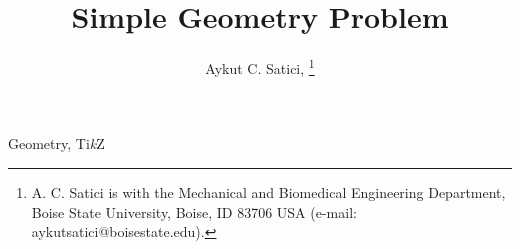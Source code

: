 \documentclass[journal,twoside,web]{ieeecolor}
\begin{document}
\title{Simple Geometry Problem} 
\author{
    Aykut C. Satici, 
    \thanks{A. C. Satici is with the Mechanical and Biomedical Engineering Department, Boise State University, Boise, ID 83706 USA
    (e-mail: aykutsatici@boisestate.edu).}
}
\maketitle

  

\begin{IEEEkeywords}
  Geometry, Ti\textit{k}Z
\end{IEEEkeywords}






        
  


\end{document}
